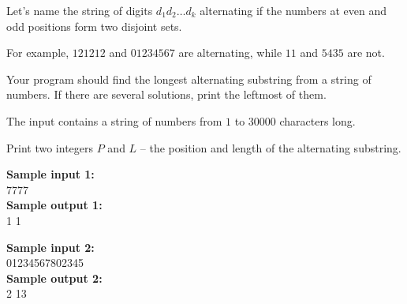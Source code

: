 \documentclass[a4paper]{article}
\begin{document}
Let's name the string of digits $d_1 d_2 \dots d_k$ alternating if the numbers at even and odd positions form two disjoint sets.

For example, $121212$ and $01234567$ are alternating, while $11$ and $5435$ are not.

Your program should find the longest alternating substring from a string of numbers. If there are several solutions, print the leftmost of them.

The input contains a string of numbers from $1$ to $30000$ characters long.

Print two integers $P$ and $L$ -- the position and length of the alternating substring.

\LINE

\noindent \textbf{Sample input 1:}\\
7777\\


\noindent \textbf{Sample output 1:}\\
1 1\\

\SPACE

\noindent \textbf{Sample input 2:}\\
01234567802345\\


\noindent \textbf{Sample output 2:}\\
2 13
\end{document}

